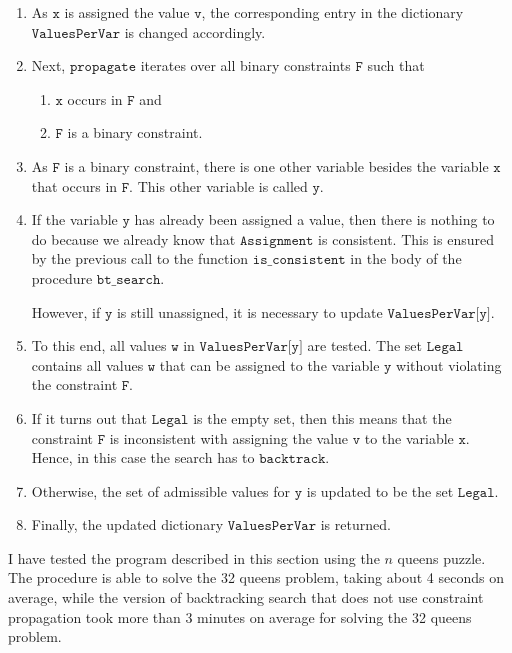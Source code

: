 \begin{enumerate}
\item As $\texttt{x}$ is assigned the value $\texttt{v}$, the corresponding entry in the dictionary
      $\texttt{ValuesPerVar}$ is changed accordingly. 
\item Next, $\texttt{propagate}$ iterates over all binary constraints $\texttt{F}$ such that
      \begin{enumerate}
      \item $\texttt{x}$ occurs in $\texttt{F}$ and
      \item $\texttt{F}$ is a binary constraint.
      \end{enumerate}
\item As $\texttt{F}$ is a binary constraint, there is one other variable besides the variable $\texttt{x}$
      that occurs in $\texttt{F}$.  This other variable is called $\texttt{y}$.  
\item If the variable $\texttt{y}$ has already been assigned a value, then there is nothing to do because
      we already know that $\texttt{Assignment}$ is consistent.  This is ensured by the
      previous call to the function $\texttt{is\_consistent}$ in the body of the procedure $\texttt{bt\_search}$.

      However, if $\texttt{y}$ is still unassigned, it is necessary to update $\texttt{ValuesPerVar[y]}$.
\item To this end, all values $\texttt{w}$ in $\texttt{ValuesPerVar[y]}$ are tested.  
      The set $\texttt{Legal}$ contains all values $\texttt{w}$ that can be assigned to the variable $\texttt{y}$
      without violating the constraint $\texttt{F}$.
\item If it turns out that $\texttt{Legal}$ is the empty set, then this means that the constraint
      $\texttt{F}$ is inconsistent with assigning the value $\texttt{v}$ to the variable
      $\texttt{x}$.  Hence, in this case the  search has to  $\texttt{backtrack}$.
\item Otherwise, the set of admissible values for $\texttt{y}$ is updated to be the set $\texttt{Legal}$.
\item Finally, the updated dictionary $\mathtt{ValuesPerVar}$ is returned.
\end{enumerate}
I have tested the program described in this section using the $n$ queens puzzle. 
The procedure is able to solve the 32 queens problem, taking about 4 seconds on average, while the version
of backtracking search that does not use constraint propagation took more than 3 minutes on average for solving
the 32 queens problem.

